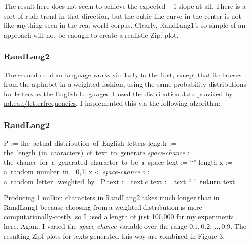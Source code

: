 \documentclass{article}
\begin{document}
The result here does not seem to achieve the expected $  -1  $ slope at all. There is a sort of rude trend in that direction, but the cubic-like curve in the center is not like anything seen in the real world corpus. Clearly, RandLang1's so simple of an approach will not be enough to create a realistic Zipf plot.

\subsubsection{RandLang2}

The second random language works similarly to the first, except that it chooses from the alphabet in a weighted fashion, using the same probability distributions for letters as the English languages. I used the distribution data provided by \href{https://www3.nd.edu/~busiforc/handouts/cryptography/letterfrequencies.html}{nd.edu/letterfrequencies}. I implemented this via the following algorithm:


\vspace{0.4cm}
\subsubsection*{RandLang2}
\begin{adjustwidth}{1cm}{}\begin{programbox}
P := \mbox{the actual distribution of English letters}
length := \mbox{the length (in characters) of text to generate}
\textit{space-chance} := \mbox{the chance for a generated character to be a space}
text := ``''
 \TO length \DO
  x := \mbox{a random number in } [0,1]
  \IF x < \textit{space-chance}
    \THEN c := \mbox{a random letter, weighted by } P
      text := text \concat c
    \ELSE text := text \concat `` ''
  \FI
\OD
\textbf{return } text
\end{programbox}\end{adjustwidth}
 \vspace{0.6cm}

Producing 1 million characters in RandLang2 takes much longer than in RandLang1 because choosing from a weighted distribution is more computationally-costly, so I used a length of just 100,000 for my experiments here. Again, I varied the \textit{space-chance} variable over the range $  0.1, 0.2, \dots, 0.9  $. The resulting Zipf plots for texts generated this way are combined in Figure 3.
\end{document}
